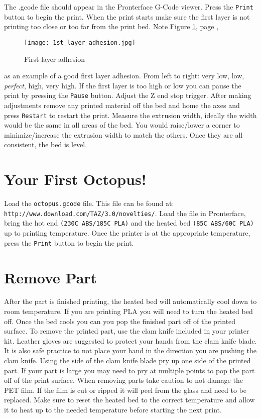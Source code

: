 The .gcode file should appear in the Pronterface G-Code viewer. Press the \texttt{Print} button to begin the print. When the print starts make sure the first layer is not printing too close or too far from the print bed. Note 
Figure \ref{fig:1st_layer_adhesion}, page \pageref{fig:1st_layer_adhesion},
\begin{figure}[hbt]
\centering
\texttt{[image: 1st\_layer\_adhesion.jpg]}
\caption{First layer adhesion}
\label{fig:1st_layer_adhesion}
\end{figure}
as an example of a good first layer adhesion. From left to right: very low, low, \emph{perfect}, high, very high. If the first layer is too high or low you can pause the print by pressing the \texttt{Pause} button. Adjust the Z end stop trigger. After making adjustments remove any printed material off the bed and home the axes and press \texttt{Restart} to restart the print. Measure the extrusion width, ideally the width would be the same in all areas of the bed. You would raise/lower a corner to minimize/increase the extrusion width to match the others. Once they are all consistent, the bed is level.

\section{Your First Octopus!}
Load the \texttt{octopus.gcode} file. This file can be found at:
\texttt{http://www.download.com/TAZ/3.0/novelties/}. Load the file in Pronterface, bring the hot end \texttt{(230C ABS/185C PLA)} and the heated bed \texttt{(85C ABS/60C PLA)} up to printing temperature. Once the printer is at the appropriate temperature, press the \texttt{Print} button to begin the print.

\section{Remove Part}
After the part is finished printing, the heated bed will automatically cool down to room temperature. If you are printing PLA you will need to turn the heated bed off. Once the bed cools you can you pop the finished part off of the printed surface. To remove the printed part, use the clam knife included in your printer kit. Leather gloves are suggested to protect your hands from the clam knife blade. It is also safe practice to not place your hand in the direction you are pushing the clam knife. Using the side of the clam knife blade pry up one side of the printed part. If your part is large you may need to pry at multiple points to pop the part off of the print surface. When removing parts take caution to not damage the PET film. If the film is cut or ripped it will peel from the glass and need to be replaced. Make sure to reset the heated bed to the correct temperature and allow it to heat up to the needed temperature before starting the next print.


